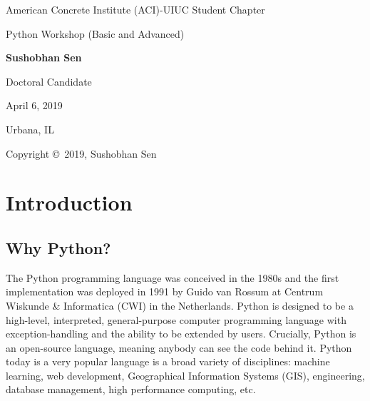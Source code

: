 \documentclass[12pt]{article}
\begin{document}
 
        

\begin{titlepage}
	\centering
	{\LARGE American Concrete Institute (ACI)-UIUC Student Chapter}
	\vspace{2cm}	
	
	\begin{Large}
	Python Workshop (Basic and Advanced)
	\vspace{1cm}
	
	\textbf{Sushobhan Sen}
	\vspace{1cm}
	
	Doctoral Candidate
	\vspace{1cm}
	
	April 6, 2019
	\vspace{1cm}
	
	Urbana, IL
	\end{Large}
\end{titlepage}

Copyright \copyright\ 2019, Sushobhan Sen

\doclicenseThis
\newpage

\tableofcontents
\newpage

\section{Introduction}
\subsection{Why Python?}
The Python programming language was conceived in the 1980s and the first implementation was deployed in 1991 by Guido van Rossum at Centrum Wiskunde \& Informatica (CWI) in the Netherlands. Python is designed to be a high-level, interpreted, general-purpose computer programming language with exception-handling and the ability to be extended by users. Crucially, Python is an open-source language, meaning anybody can see the code behind it. Python today is a very popular language is a broad variety of disciplines: machine learning, web development, Geographical Information Systems (GIS), engineering, database management, high performance computing, etc.
\end{document}
